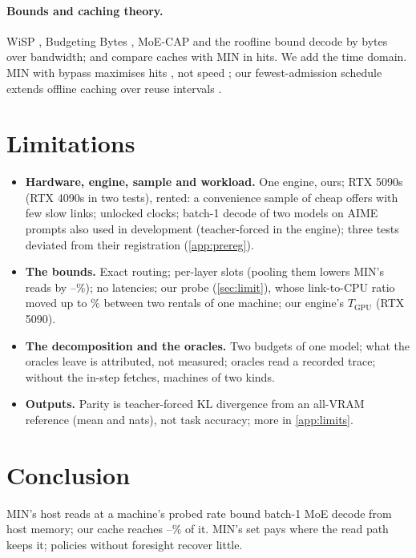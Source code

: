 \paragraph{Bounds and caching theory.} WiSP \citep{wisp2026}, Budgeting Bytes \citep{budgetingbytes2026}, MoE-CAP
\citep{moecap} and the roofline \citep{williams2009roofline} bound decode by bytes over bandwidth;
\citet{zhang2026reproducible} and \citet{liang2026lrc} compare caches with MIN in hits. We add the time domain. MIN
with bypass maximises hits \citep{carlisle1995kcoloring,jain2016hawkeye}, not speed \citep{bypassopt}; our
fewest-admission schedule extends offline caching over reuse intervals \citep{berger2018foo}.

\section{Limitations}\label{sec:limits}
\begin{itemize}\setlength\itemsep{1pt}
\item \textbf{Hardware, engine, sample and workload.} One engine, ours; RTX 5090s (RTX 4090s in two tests),
rented: a convenience sample of cheap offers with few slow links; unlocked clocks; batch-1 decode of two models on AIME prompts
also used in development (teacher-forced in the engine); three tests deviated from their registration (\cref{app:prereg}).
\item \textbf{The bounds.} Exact routing; per-layer slots (pooling them lowers MIN's reads by
\globalReadsMin--\globalReadsMax\%); no latencies; our probe (\cref{sec:limit}), whose link-to-CPU ratio moved up to
\tcRelaunchRatioDevMax\% between two rentals of one machine; our engine's $T_{\text{GPU}}$ (RTX 5090).
\item \textbf{The decomposition and the oracles.} Two budgets of one model; what the oracles leave is attributed, not
measured; oracles read a recorded trace; without the in-step fetches, \dpNWord{} machines of two kinds.
\item \textbf{Outputs.} Parity is teacher-forced KL divergence from an all-VRAM reference (mean \klMeanGpt{} and
\klMeanQwen{} nats), not task accuracy; more in \cref{app:limits}.
\end{itemize}

\section{Conclusion}
MIN's host reads at a machine's probed rate bound batch-1 MoE decode from host memory; our cache reaches
\dcShareMinLowMin--\dcShareMinLowMax\% of it. MIN's set pays where the read path keeps it; policies without foresight
recover little.

